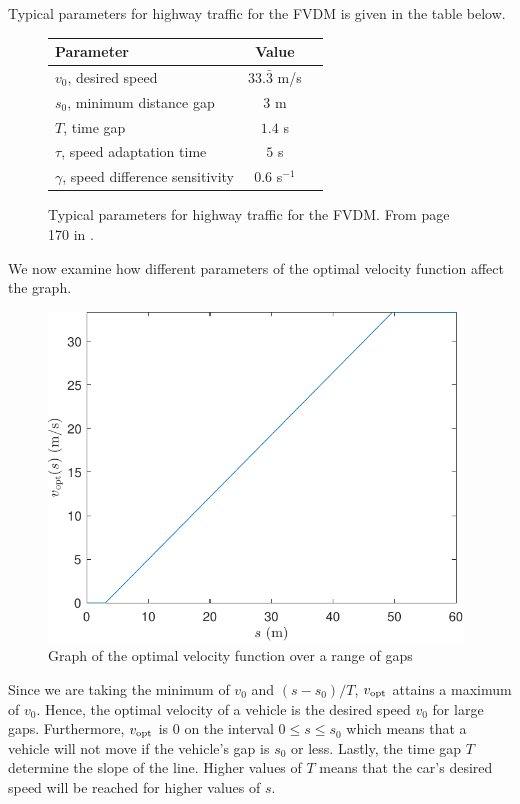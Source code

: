 \documentclass[12pt]{article}
\begin{document}
    Typical parameters for highway traffic for the FVDM is given in the table below. 
    \begin{figure}[H]
      \begin{center}
        \begin{tabular}{l c c } 
        Parameter & Value \\
        \hline
        $v_0$, desired speed & $33.\bar{3}$ m/s \\
        $s_0$, minimum distance gap & $3$ m \\
        $T$, time gap & $1.4$ s \\
        $\tau$, speed adaptation time & $5$ s \\
        $\gamma$, speed difference sensitivity & $0.6$ s$^{-1}$ \\
        \end{tabular}
        \end{center}
        \caption{Typical parameters for highway traffic for the FVDM. From page 170 in \cite{traffic}.}
        \label{fig:parameters}
    \end{figure}
    We now examine how different parameters of the optimal velocity function affect the graph. 
    \begin{figure}[H]
        \includegraphics[width=11cm]{vopt_versus_s.pdf}
        \centering
        \caption{Graph of the optimal velocity function over a range of gaps}
    \end{figure}
    Since we are taking the minimum of $v_0$ and $(s-s_0)/T$, $v_{\rm opt}$ attains a maximum of $v_0$. Hence, the optimal velocity of a vehicle is the desired speed $v_0$ for large gaps. Furthermore, $v_{\rm opt}$ is $0$ on the interval $0 \leq s \leq s_0$ which means that a vehicle will not move if the vehicle's gap is $s_0$ or less. Lastly, the time gap $T$ determine the slope of the line. Higher values of $T$ means that the car's desired speed will be reached for higher values of $s$.
    
\end{document}
